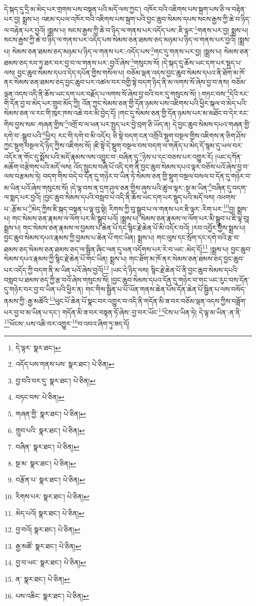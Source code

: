 དེ་སྐད་དུ་དྲི་མ་མེད་པར་གྲགས་པས་བསྟན་པའི་མདོ་ལས་ཀྱང་། འཁོར་བའི་འཇིགས་པས་སྐྲག་པས་ཅི་ལ་བརྟེན་པར་བྱ། སྨྲས་པ། འཇམ་དཔལ་འཁོར་བའི་འཇིགས་པས་སྐྲག་པའི་བྱང་ཆུབ་སེམས་དཔས་སངས་རྒྱས་ཀྱི་ཆེ་བ་ཉིད་ལ་བརྟེན་པར་བྱའོ། །སྨྲས་པ། སངས་རྒྱས་ཀྱི་ཆེ་བ་ཉིད་ལ་གནས་པར་འདོད་པས་:ཇི་ལྟར་\footnote{དེ་ལྟར་  སྣར་ཐང་། }གནས་པར་བྱ། སྨྲས་པ། སངས་རྒྱས་ཀྱི་ཆེ་བ་ཉིད་ལ་གནས་པར་འདོད་པས་སེམས་ཅན་ཐམས་ཅད་མཉམ་པ་ཉིད་ལ་གནས་པར་བྱའོ། །སྨྲས་པ། སེམས་ཅན་ཐམས་ཅད་མཉམ་པ་ཉིད་ལ་གནས་པར་:འདོད་པས་\footnote{འདོད་པས་གནས་པས་  སྣར་ཐང་།  པེ་ཅིན། }གང་དུ་གནས་པར་བྱ། །སྨྲས་པ། སེམས་ཅན་ཐམས་ཅད་རབ་ཏུ་ཐར་བར་བྱ་བ་ལ་གནས་པར་:བྱའོ་ཞེས་\footnote{བྱ་བའི་བར་དུ་  སྣར་ཐང་།  པེ་ཅིན། }གསུངས་སོ། །དེ་སྐད་དུ་ཆོས་ཡང་དག་པར་སྡུད་པ་ལས། བྱང་ཆུབ་སེམས་དཔའ་དེད་དཔོན་གྱིས་གསོལ་པ། བཅོམ་ལྡན་འདས་བྱང་ཆུབ་སེམས་དཔའ་ནི་ཐོག་མ་ཁོ་ནར་སེམས་ཅན་ཐམས་ཅད་བྱང་ཆུབ་པར་འཚལ་བར་བགྱི་སྟེ་བདག་ཉིད་ནི་མ་ལགས་སོ་ཞེས་བྱ་བ་ནས། བཅོམ་ལྡན་འདས་འདི་ནི་ཆོས་ཡང་དག་པར་བརྗོད་པ་ལགས་སོ་ཞེས་བྱ་བའི་བར་དུ་གསུངས་སོ། །:གཏང་བས་\footnote{བཏང་བས་  པེ་ཅིན། }དེའི་རང་གི་དོན་བྱ་བ་མེད་པར་གྲུབ་མོད་ཀྱི། འོན་ཀྱང་སེམས་ཅན་གྱི་དོན་ཉམས་པས་འཇིགས་པའི་ཕྱིར་སྐལ་བ་མེད་པའི་སེམས་ཅན་ལ་རང་གི་ཁུར་ཁས་འཆེ་བར་མི་བྱེད་དོ། །གང་དུ་སེམས་ཅན་གྱི་དོན་ཉམས་པར་མ་མཐོང་བ་དེར་རང་གིས་བྱས་སམ་:གཞན་གྱིས་\footnote{གཞན་གྱི་  སྣར་ཐང་།  པེ་ཅིན། }འགྲོ་བ་ལ་ཕན་པར་སྤྱད་པར་བྱེ་བྲག་ཅི་ཡོད་ན། དེ་བྱང་ཆུབ་སེམས་དཔའ་གཞན་གྱི་དགེ་བ་:སྒྲུབ་པའི་\footnote{གྲུབ་པའི་  སྣར་ཐང་།  པེ་ཅིན། }ཕྱིར། རང་གི་དགེ་བ་མི་འདོར། ཅི་སྟེ་བདག་ངན་འགྲོའི་སྡུག་བསྔལ་གྱིས་འཇིགས་ན་ཅིག་ཤོས་ཀྱང་སྡུག་བསྔལ་དེ་ཉིད་ཀྱིས་འཇིགས་སོ། །ཇི་སྟེ་དེ་སྡུག་བསྔལ་བས་བདག་ལ་གནོད་པ་མེད་དོ་སྙམ་དུ་ཡལ་བར་འདོར་ན་གོང་དུ་སྨོས་པའི་མདོ་རྣམས་ལས་འབྱུང་བ་:བཞིན་དུ་\footnote{བཞིན་  སྣར་ཐང་།  པེ་ཅིན། }ཉེས་པ་དང་བཅས་པར་འགྱུར་རོ། །ཡང་དཀོན་མཆོག་བརྩེགས་པའི་མདོ་ལས། འོད་སྲུངས་བཞི་པོ་འདི་དག་ནི་བྱང་ཆུབ་སེམས་དཔའ་ལྟར་བཅོས་པའོ་ཞེས་བྱ་བ་ལས་བརྩམས་ཏེ། བདག་གིས་བདེ་བ་དོན་དུ་གཉེར་བ་ཡིན་ཏེ་སེམས་ཅན་གྱི་སྡུག་བསྔལ་བསལ་བ་དོན་དུ་གཉེར་བ་མ་ཡིན་པའོ་ཞེས་གསུངས་སོ། །དེ་ལྟ་བས་ན་དྲག་ཤུལ་ཅན་གྱིས་ཞུས་པའི་ཚུལ་ལྟར་:སྔ་མ་ཡིན་\footnote{སྔ་མ་  སྣར་ཐང་།  པེ་ཅིན། }བཞིན་དུ་བདག་ལ་སྨད་པར་བྱའོ། །བྱང་ཆུབ་སེམས་དཔའི་བསླབ་པ་འདི་ནི་ཆོས་ཡང་དག་པར་སྡུད་པའི་མདོ་ལས། འཕགས་པ་:རྩོམ་པ་\footnote{བརྩོན་པ་  སྣར་ཐང་།  པེ་ཅིན། }མེད་ཀྱིས་ཇི་སྐད་བསྟན་པ་ལྟ་བུ་སྟེ། རིགས་ཀྱི་བུ་སྒྲུབ་པ་ལ་གནས་པར་ཇི་ལྟར་:རིག་པར་\footnote{རིགས་པར་  སྣར་ཐང་།  པེ་ཅིན། }བྱ། སྨྲས་པ། གང་སེམས་ཅན་རྣམས་ལ་ལོག་པར་མི་སྒྲུབ་པའོ། །སྨྲས་པ། སེམས་ཅན་རྣམས་ལ་ལོག་པར་མི་སྒྲུབ་པ་ཇི་ལྟ་བུ། སྨྲས་པ། གང་སེམས་ཅན་རྣམས་ལ་བྱམས་པ་ཆེན་པོ་དང་སྙིང་རྗེ་ཆེན་པོ་མི་འདོར་བའོ། །རབ་འབྱོར་གྱིས་སྨྲས་པ། བྱང་ཆུབ་སེམས་དཔའ་རྣམས་ཀྱི་བྱམས་པ་ཆེན་པོ་གང་ཡིན། སྨྲས་པ། གང་ལུས་དང་སྲོག་དང་དགེ་བའི་རྩ་བ་ཐམས་ཅད་སེམས་ཅན་ཐམས་ཅད་ལ་སྦྱིན་ཞིང་ལན་དུ་ཕན་འདོགས་པར་རེ་བ་ཡང་:མེད་དོ།\footnote{མེད་པའོ།  སྣར་ཐང་།  པེ་ཅིན། } །སྨྲས་པ། བྱང་ཆུབ་སེམས་དཔའ་རྣམས་ཀྱི་སྙིང་རྗེ་ཆེན་པོ་གང་ཡིན། སྨྲས་པ། གང་ཐོག་མ་ཁོ་ནར་སེམས་ཅན་ཐམས་ཅད་བྱང་ཆུབ་པར་འདོད་ཀྱི་བདག་ནི་མ་ཡིན་པའོ་ཞེས་བྱའོ།\footnote{བྱ་བའོ།  སྣར་ཐང་།  པེ་ཅིན། } །ཡང་དེ་ཉིད་ལས། སྙིང་རྗེ་ཆེན་པོ་ནི་བྱང་ཆུབ་སེམས་དཔའི་བསླབ་པ་ཐམས་ཅད་ཀྱི་རྩ་བའོ་ཞེས་གསུངས་སོ། །བྱང་ཆུབ་སེམས་དཔའ་དོན་དུ་གཉེར་བ་གང་ཡང་རུང་བས་དོན་དུ་གཉེར་བར་བྱ་བ་ཡིན་པའི་ཕྱིར་ན། གང་གིས་སྦྱིན་པ་པོ་ཡོན་གནས་ཆེན་པོས་དོན་ཆེན་པོ་སྦྱིན་པ་ལས་བསོད་ནམས་ཀྱི་:རྒྱ་མཚོའི་\footnote{རྒྱ་མཚོ་  སྣར་ཐང་།  པེ་ཅིན། }ཕུང་པོ་ཆེན་པོ་སྣང་བར་འགྱུར་བ་འདི་ནི་གདོན་མི་ཟ་བར་བཅོམ་ལྡན་འདས་ཀྱིས་བཟློག་པར་བྱ་བ་མ་ཡིན་པ་དང་། གདོན་མི་ཟ་བར་བསྟན་ཏོ་ཞེས་:བྱ་བར་ཡོང་\footnote{བྱ་བ་ཡང་  སྣར་ཐང་།  པེ་ཅིན། }ངེས་པ་ཡིན་ཏེ། དེ་ལྟ་མ་ཡིན་:ན་ནི་\footnote{ན་  སྣར་ཐང་།  པེ་ཅིན། }ཕོངས་:པས་འཆི་བར་འགྱུར་\footnote{པས་འཆིང་  སྣར་ཐང་།  པེ་ཅིན། }བ་འབའ་ཞིག་ཏུ་ཟད་དོ། 